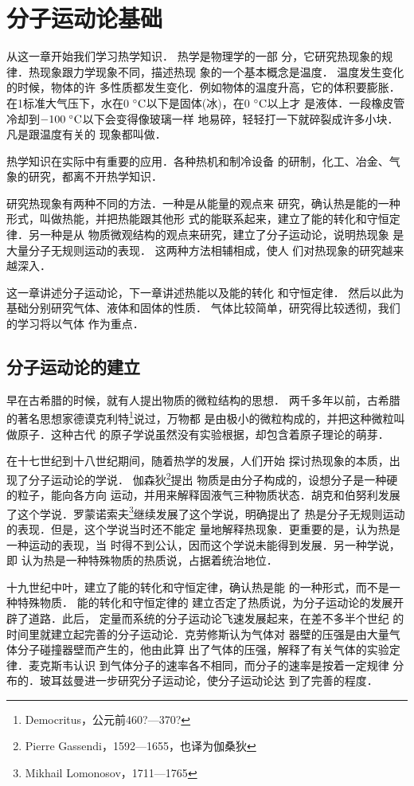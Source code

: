 \chapter{分子运动论基础}\label{chapter-foundations-of-molecular-kinematics}

从这一章开始我们学习热学知识．
热学是物理学的一部
分，它研究热现象的规律．热现象跟力学现象不同，描述热现
象的一个基本概念是温度．
温度发生变化的时候，物体的许
多性质都发生变化．例如物体的温度升高，它的体积要膨胀．
在1标准大气压下，水在0$\;{}^\circ\text{C}$以下是固体(冰)，在0$\;{}^\circ\text{C}$以上才
是液体．一段橡皮管冷却到$-100 \;{}^\circ\text{C}$以下会变得像玻璃一样
地易碎，轻轻打一下就碎裂成许多小块．凡是跟温度有关的
现象都叫做．

热学知识在实际中有重要的应用．各种热机和制冷设备
的研制，化工、冶金、气象的研究，都离不开热学知识．

研究热现象有两种不同的方法．一种是从能量的观点来
研究，确认热是能的一种形式，叫做热能，并把热能跟其他形
式的能联系起来，建立了能的转化和守恒定律．另一种是从
物质微观结构的观点来研究，建立了分子运动论，说明热现象
是大量分子无规则运动的表现．
这两种方法相辅相成，使人
们对热现象的研究越来越深入．

这一章讲述分子运动论，下一章讲述热能以及能的转化
和守恒定律．
然后以此为基础分别研究气体、液体和固体的性质．
气体比较简单，研究得比较透彻，我们的学习将以气体
作为重点．

\section{分子运动论的建立}
    早在古希腊的时候，就有人提出物质的微粒结构的思想．
两千多年以前，古希腊的著名思想家德谟克利特\footnote{Democritus，公元前460?---370?}说过，万物都
是由极小的微粒构成的，并把这种微粒叫做原子．这种古代
的原子学说虽然没有实验根据，却包含着原子理论的萌芽．

    在十七世纪到十八世纪期间，随着热学的发展，人们开始
探讨热现象的本质，出现了分子运动论的学说．
伽森狄\footnote{Pierre Gassendi，1592---1655，也译为伽桑狄}提出
物质是由分子构成的，设想分子是一种硬的粒子，能向各方向
运动，并用来解释固液气三种物质状态．胡克和伯努利发展
了这个学说．罗蒙诺索夫\footnote{Mikhail Lomonosov，1711---1765}继续发展了这个学说，明确提出了
热是分子无规则运动的表现．但是，这个学说当时还不能定
量地解释热现象．更重要的是，认为热是一种运动的表现，当
时得不到公认，因而这个学说未能得到发展．另一种学说，即
认为热是一种特殊物质的热质说，占据着统治地位．

   十九世纪中叶，建立了能的转化和守恒定律，确认热是能
的一种形式，而不是一种特殊物质．
能的转化和守恒定律的
建立否定了热质说，为分子运动论的发展开辟了道路．此后，
定量而系统的分子运动论飞速发展起来，在差不多半个世纪
的时间里就建立起完善的分子运动论．克劳修斯认为气体对
器壁的压强是由大量气体分子碰撞器壁而产生的，他由此算
出了气体的压强，解释了有关气体的实验定律．麦克斯韦认识
到气体分子的速率各不相同，而分子的速率是按着一定规律
分布的．玻耳兹曼进一步研究分子运动论，使分子运动论达
到了完善的程度．

